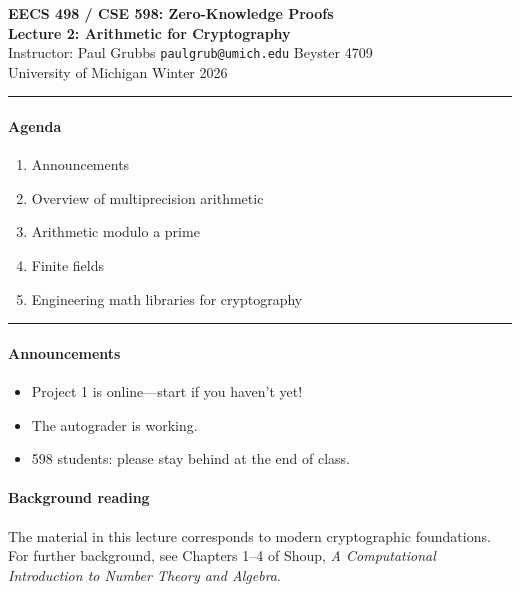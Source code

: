 \documentclass[11pt]{article}
\begin{document}

\begin{center}
  {\Large \textbf{EECS 498 / CSE 598: Zero-Knowledge Proofs}} \\[4pt]
  {\large \textbf{Lecture 2: Arithmetic for Cryptography}} \\[4pt]
  {\normalsize Instructor: Paul Grubbs \quad
   \texttt{paulgrub@umich.edu} \quad Beyster 4709} \\[2pt]
  {\normalsize University of Michigan \quad Winter 2026}
\end{center}

\medskip
\hrule
\medskip

\paragraph{Agenda}
\begin{enumerate}[label=(\arabic*)]
  \item Announcements
  \item Overview of multiprecision arithmetic
  \item Arithmetic modulo a prime
  \item Finite fields
  \item Engineering math libraries for cryptography
\end{enumerate}

\medskip
\hrule
\medskip

\paragraph{Announcements}
\begin{itemize}
  \item Project 1 is online---start if you haven't yet!
  \item The autograder is working.
  \item 598 students: please stay behind at the end of class.
\end{itemize}

\paragraph{Background reading}
The material in this lecture corresponds to modern cryptographic
foundations.  For further background, see Chapters 1--4 of Shoup,
\emph{A Computational Introduction to Number Theory and Algebra}.
\end{document}
